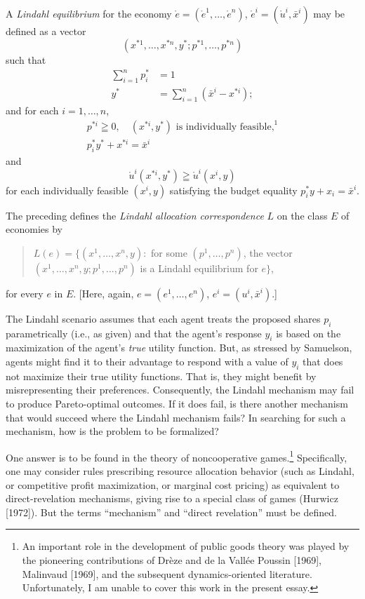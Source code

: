 \documentclass[12pt, letterpaper]{article}
\begin{document}
A \textit{Lindahl equilibrium} for the economy $\mathring{e} = (\mathring{e}^1, \dots, \mathring{e}^n)$, $\mathring{e}^i = (\mathring{u}^i, \bar{x}^i)$ may be defined as a vector
\[
(x^{*1}, \dots, x^{*n}, y^*; p^{*1}, \dots, p^{*n})
\]
such that
\begin{align*}
    \sum_{i=1}^{n} p_i^* &= 1 \\
    y^* &= \sum_{i=1}^{n} (\bar{x}^i - x^{*i});
\end{align*}
and for each $i = 1, \dots, n$,
\begin{gather*}
    p^{*i} \geqq 0, \quad (x^{*i}, y^*) \text{ is individually feasible,}^1 \\
    p_i^* y^* + x^{*i} = \bar{x}^i
\end{gather*}
and
\[
\mathring{u}^i(x^{*i}, y^*) \geqq \mathring{u}^i(x^i, y)
\]
for each individually feasible $(x^i, y)$ satisfying the budget equality $p_i^* y + x_i = \bar{x}^i$.

The preceding defines the \textit{Lindahl allocation correspondence} $L$ on the class $E$ of economies by
\begin{quote}
    $L(e) = \{(x^1, \dots, x^n, y) \colon$ for some $(p^1, \dots, p^n)$, the vector $(x^1, \dots, x^n, y; p^1, \dots, p^n)$ is a Lindahl equilibrium for $e \}$,
\end{quote}
for every $e$ in $E$. [Here, again, $e = (e^1, \dots, e^n)$, $e^i = (u^i, \bar{x}^i)$.]

The Lindahl scenario assumes that each agent treats the proposed shares $p_i$ parametrically (i.e., as given) and that the agent's response $y_i$ is based on the maximization of the agent's \textit{true} utility function. But, as stressed by Samuelson, agents might find it to their advantage to respond with a value of $y_i$ that does not maximize their true utility functions. That is, they might benefit by misrepresenting their preferences. Consequently, the Lindahl mechanism may fail to produce Pareto-optimal outcomes. If it does fail, is there another mechanism that would succeed where the Lindahl mechanism fails? In searching for such a mechanism, how is the problem to be formalized?

One answer is to be found in the theory of noncooperative games.\footnote{An important role in the development of public goods theory was played by the pioneering contributions of Drèze and de la Vallée Poussin [1969], Malinvaud [1969], and the subsequent dynamics-oriented literature. Unfortunately, I am unable to cover this work in the present essay.} Specifically, one may consider rules prescribing resource allocation behavior (such as Lindahl, or competitive profit maximization, or marginal cost pricing) as equivalent to direct-revelation mechanisms, giving rise to a special class of games (Hurwicz [1972]). But the terms ``mechanism'' and ``direct revelation'' must be defined.
\end{document}
